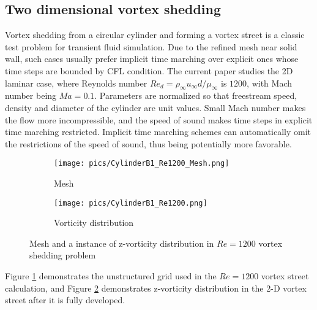 \documentclass[preprint,12pt]{elsarticle}
\begin{document}
\subsection{Two dimensional vortex shedding}

Vortex shedding from a circular cylinder and forming a vortex street
is a classic test problem for transient fluid simulation. Due to the refined
mesh near solid wall, such cases usually prefer implicit time marching
over explicit ones whose time steps are bounded by CFL condition.
The current paper studies the 2D laminar case, where
Reynolds number
$Re_d=\rho_\infty u_\infty d / \mu_\infty $ is  $1200$,
with Mach number being $Ma=0.1$.
Parameters are normalized so that freestream speed, density
and diameter of the cylinder are unit values.
Small Mach number makes the flow more incompressible, and
the speed of sound makes time steps in explicit time marching
restricted.
Implicit time marching schemes can automatically omit the restrictions
of the speed of sound, thus being potentially more favorable.

\begin{figure}[htbp]
    \centering
    \begin{subfigure}{0.5\textwidth}
        \texttt{[image: pics/CylinderB1\_Re1200\_Mesh.png]}
        \caption[]{Mesh}
        \label{sfig:CylinderRe1200Demo_Mesh}
    \end{subfigure}\hfill
    \begin{subfigure}{0.5\textwidth}
        \texttt{[image: pics/CylinderB1\_Re1200.png]}
        \caption[]{Vorticity distribution}
        \label{sfig:CylinderRe1200Demo_Vort}
    \end{subfigure}
    \caption[]{Mesh and a instance of z-vorticity distribution
        in $Re=1200$ vortex shedding problem}
    \label{fig:CylinderRe1200Demo}
\end{figure}

Figure \ref{sfig:CylinderRe1200Demo_Mesh} demonstrates
the unstructured grid used in the $Re=1200$  vortex
street calculation, and Figure \ref{sfig:CylinderRe1200Demo_Vort}
demonstrates z-vorticity distribution in the 2-D vortex street
after it is fully developed.
\end{document}
